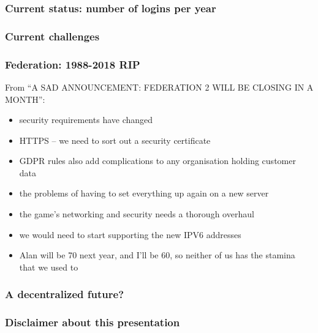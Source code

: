 \documentclass[aspectratio=169]{beamer}
\begin{document}
\begin{frame}
\frametitle{Current status: number of logins per year}
\end{frame}

\begin{frame}
\frametitle{Current challenges}
\end{frame}


\begin{frame}
\frametitle{Federation: 1988-2018 RIP}
From ``A SAD ANNOUNCEMENT: FEDERATION 2 WILL BE CLOSING IN A MONTH'':
  \begin{itemize}
    \item{} security requirements have changed
    \item{} HTTPS -- we need to sort out a security certificate
    \item{} GDPR rules also add complications to any organisation holding customer data
    \item{} the problems of having to set everything up again on a new server
    \item{} the game’s networking and security needs a thorough overhaul
    \item{} we would need to start supporting the new IPV6 addresses
    \item{} Alan will be 70 next year, and I’ll be 60, so neither of us has the stamina that we used to
  \end{itemize}
\end{frame}

\begin{frame}
\frametitle{A decentralized future?}
\end{frame}

\begin{frame}
\frametitle{Disclaimer about this presentation}
\end{frame}

\subtitle{Thank you}
\frame[plain]{\titlepage}
\end{document}
